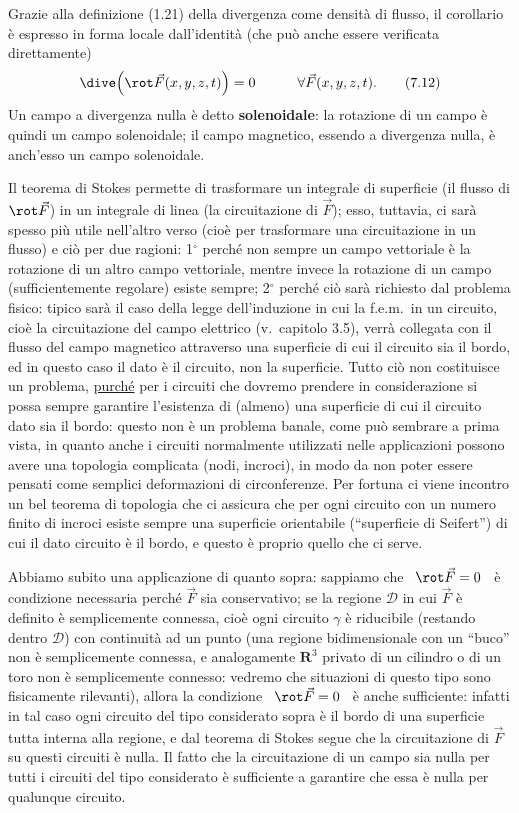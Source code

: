 Grazie alla definizione (1.21) della divergenza come densit\`a di flusso, il
corollario \`e espresso in forma locale dall'identit\`a (che pu\`o anche essere
verificata direttamente)
\begin{equation}
  \dive\Big(\rot\vec F(x,y,z,t)\Big)=0\qquad\quad\forall\vec F(x,y,z,t).
  \tag{7.12}
\end{equation}
Un campo a divergenza nulla \`e detto \textbf{solenoidale}: la rotazione di un
campo \`e quindi un campo solenoidale; il campo magnetico, essendo a divergenza
nulla, \`e anch'esso un campo solenoidale.

Il teorema di Stokes permette di trasformare un integrale di superficie (il
flusso di $\rot\vec F$) in un integrale di linea (la circuitazione di $\vec F$);
esso, tuttavia, ci sar\`a spesso pi\`u utile nell'altro verso (cio\`e per
trasformare una circuitazione in un flusso) e ci\`o per due ragioni: 1$^\circ$
perch\'e non sempre un campo vettoriale \`e la rotazione di un altro campo
vettoriale, mentre invece la rotazione di un campo (sufficientemente regolare)
esiste sempre; 2$^\circ$ perch\'e ci\`o sar\`a richiesto dal problema fisico:
tipico sar\`a il caso della legge dell'induzione in cui la f.e.m.\ in un
circuito, cio\`e la circuitazione del campo elettrico (v.\ capitolo 3.5),
verr\`a collegata con il flusso del campo magnetico attraverso una superficie di
cui il circuito sia il bordo, ed in questo caso il dato \`e il circuito, non la
superficie. Tutto ci\`o non costituisce un problema, \underline{purch\'e} per i
circuiti che dovremo prendere in considerazione si possa sempre garantire
l'esistenza di (almeno) una superficie di cui il circuito dato sia il bordo:
questo non \`e un problema banale, come pu\`o sembrare a prima vista, in quanto
anche i circuiti normalmente utilizzati nelle applicazioni possono avere una
topologia complicata (nodi, incroci), in modo da non poter essere pensati come
semplici deformazioni di circonferenze. Per fortuna ci viene incontro un bel
teorema di topologia che ci assicura che per ogni circuito con un numero finito
di incroci esiste sempre una superficie orientabile (``superficie di Seifert'')
di cui il dato circuito \`e il bordo, e questo \`e proprio quello che ci serve.

Abbiamo subito una applicazione di quanto sopra: sappiamo che \ $\rot\vec F=0$
\ \`e condizione necessaria perch\'e $\vec F$ sia conservativo; se la regione
$\mathcal D$ in cui $\vec F$ \`e definito \`e semplicemente connessa, cio\`e
ogni circuito $\gamma$ \`e riducibile (restando dentro $\mathcal D$) con
continuit\`a ad un punto (una regione bidimensionale con un ``buco'' non \`e
semplicemente connessa, e analogamente $\boldsymbol R^3$ privato di un cilindro
o di un toro non \`e semplicemente connesso: vedremo che situazioni di questo
tipo sono fisicamente rilevanti), allora la condizione \ $\rot\vec F=0$ \ \`e
anche sufficiente: infatti in tal caso ogni circuito del tipo considerato sopra
\`e il bordo di una superficie tutta interna alla regione, e dal teorema di
Stokes segue che la circuitazione di $\vec F$ su questi circuiti \`e nulla. Il
fatto che la circuitazione di un campo sia nulla per tutti i circuiti del tipo
considerato \`e sufficiente a garantire che essa \`e nulla per qualunque
circuito.

